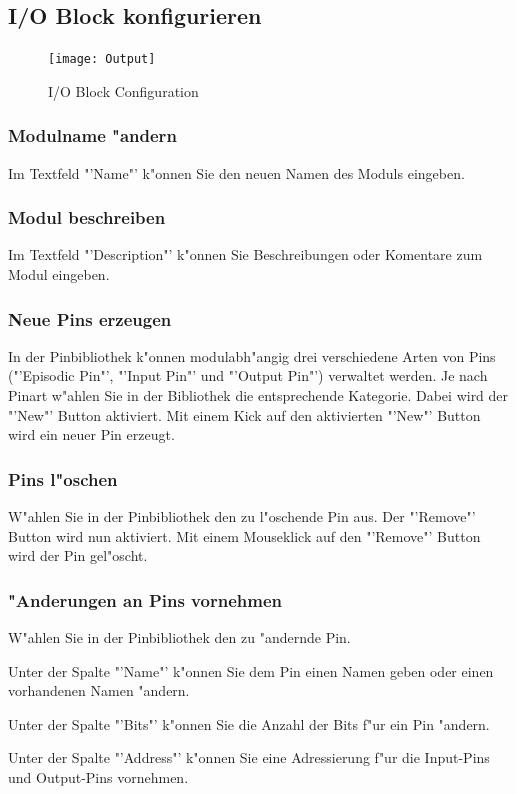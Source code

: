 \documentclass[a4paper,titlepage,12pt,ngerman]{scrbook}
\begin{document}
\subsection{I/O Block konfigurieren}
\begin{figure}[htbp]
\begin{center}
\texttt{[image: Output]}
\caption{I/O Block Configuration}\label{test}
\end{center}
\end{figure}
\subsubsection{Modulname "andern}
Im Textfeld "'Name"' k"onnen Sie den neuen Namen des Moduls eingeben.
\subsubsection{Modul beschreiben}
Im Textfeld "'Description"' k"onnen Sie Beschreibungen oder Komentare zum Modul eingeben.
\subsubsection{Neue Pins erzeugen}
In der Pinbibliothek k"onnen modulabh"angig drei verschiedene Arten von Pins ("'Episodic Pin"', "'Input Pin"' und "'Output Pin"') verwaltet werden. Je nach Pinart w"ahlen Sie in der Bibliothek die entsprechende Kategorie. Dabei wird der "'New"' Button aktiviert. Mit einem Kick auf den aktivierten "'New"' Button wird ein neuer Pin erzeugt. \par
\subsubsection{Pins l"oschen}
W"ahlen Sie in der Pinbibliothek den zu l"oschende Pin aus. Der "'Remove"' Button wird nun aktiviert. Mit einem Mouseklick auf den "'Remove"' Button wird der Pin gel"oscht.
\subsubsection{"Anderungen an Pins vornehmen}
W"ahlen Sie in der Pinbibliothek den zu "andernde Pin.\par
Unter der Spalte "'Name"' k"onnen Sie dem Pin einen Namen geben oder einen vorhandenen Namen "andern.\par
Unter der Spalte "'Bits"' k"onnen Sie die Anzahl der Bits f"ur ein Pin "andern.\par
Unter der Spalte "'Address"' k"onnen Sie eine Adressierung f"ur die Input-Pins und Output-Pins vornehmen.\par
\end{document}
